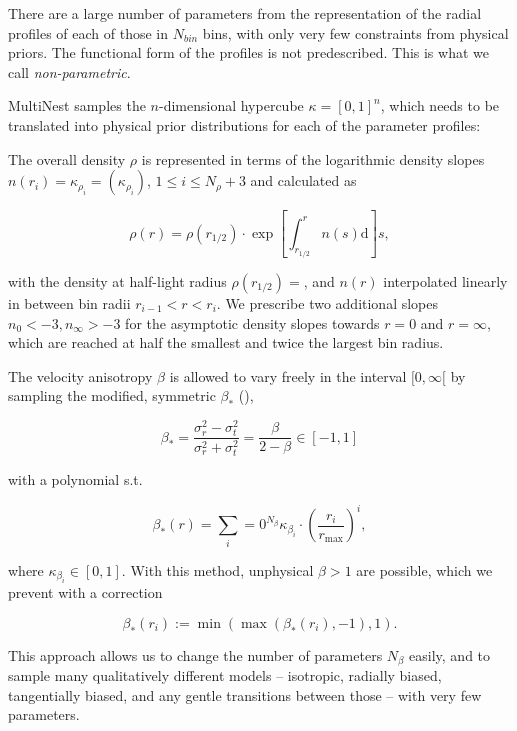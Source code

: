 There are a large number of parameters from the representation of the
radial profiles of each of those in $N_{bin}$ bins, with only very few
constraints from physical priors. The functional form of the profiles
is not predescribed. This is what we call {\it non-parametric}.

MultiNest samples the $n$-dimensional hypercube $\kappa=[0,1]^n$,
which needs to be translated into physical prior distributions for
each of the parameter profiles:

The overall density $\rho$ is represented in terms of the logarithmic
density slopes $n(r_i)=\kappa_{\rho_i} = (\kappa_{\rho_i})$, $1\leq
i\leq N_\rho+3$ and calculated as

\begin{equation*}
    \rho(r) = \rho(r_{1/2})\cdot\exp\left[\int_{r_{1/2}}^rn(s)\text{d}\right]s,
\end{equation*}

with the density at half-light radius $\rho(r_{1/2})=$, and $n(r)$
interpolated linearly in between bin radii $r_{i-1}<r<r_{i}$. We
prescribe two additional slopes $n_0 < -3, n_\infty>-3$ for the
asymptotic density slopes towards $r=0$ and $r=\infty$, which are
reached at half the smallest and twice the largest bin radius.

The velocity anisotropy $\beta$ is allowed to vary freely in the interval $[0, \infty[$ by sampling the modified, symmetric $\beta_*$ (),

\begin{equation*}
    \beta_* = \frac{\sigma_r^2-\sigma_t^2}{\sigma_r^2+\sigma_t^2} = \frac{\beta}{2-\beta} \in [-1,1]
\end{equation*}

with a polynomial s.t.

\begin{equation*}
    \beta_*(r) = \sum_i=0^{N_\beta} \kappa_{\beta_i}\cdot\left(\frac{r_i}{r_{\text{max}}}\right)^i,
\end{equation*}

where $\kappa_{\beta_i}\in [0,1]$. With this method, unphysical
$\beta>1$ are possible, which we prevent with a correction

\begin{equation*}
    \beta_*(r_i) := \min(\max(\beta_*(r_i), -1),1).
\end{equation*}

This approach allows us to change the number of parameters $N_\beta$
easily, and to sample many qualitatively different models --
isotropic, radially biased, tangentially biased, and any gentle
transitions between those -- with very few parameters.

